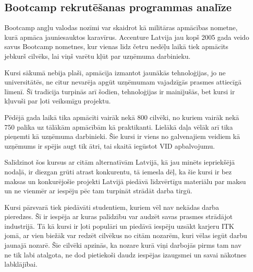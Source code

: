 \subsection{Bootcamp rekrutēšanas programmas analīze}
Bootcamp angļu valodas nozīmi var skaidrot kā militāras apmācības nometne, kurā apmāca jauniesauktos
karavīrus. Accenture Latvija jau kopš 2005 gada veido savus Bootcamp nometnes, kur vienas līdz četru 
nedēļu laikā tiek apmācīts jebkurš cilvēks, lai viņš varētu kļūt par uzņēmuma darbinieku.
\par
Kursi sākumā nebija plaši, apmācīja izmantot jaunākās tehnoloģijas, jo ne universitātēs, ne citur
nevarēja apgūt uzņēmumam vajadzīgās prasmes attiecīgā līmenī. Šī tradīcija turpinās arī šodien,
tehnoloģijas ir mainījušās, bet kursi ir kļuvuši par ļoti veiksmīgu projektu.
\par
Pēdējā gada laikā tika apmācīti vairāk nekā 800 cilvēki, no kuriem vairāk nekā 750 palika uz tālākām
apmācībām kā praktikanti. Lielākā daļa vēlāk arī tika pieņemti kā uzņēmuma darbinieki. Šie kursi ir
viens no galvenajiem veidiem kā uzņēmums ir spējis augt tik ātri, tai skaitā iegūstot VID apbalvojumu.
\par
Salīdzinot šos kursus ar citām alternatīvām Latvijā, kā jau minēts iepriekšējā nodaļā,
ir diezgan grūti atrast konkurentu, tā iemesla dēļ, ka šie kursi ir bez maksas un konkurējošie projekti
Latvijā piedāvā līdzvērtīgu materiālu par maksu un ne vienmēr ar iespēju pēc tam turpināt strādāt 
darba tirgū.
\par
Kursi pārsvarā tiek piedāvāti studentiem, kuriem vēl nav nekādas darba pieredzes. Šī ir iespēja
ar kuras palīdzību var audzēt savas prasmes strādājot industrijā. Tā kā kursi ir ļoti populāri un piedāvā
iespēju uzsākt karjeru ITK jomā, ar vien biežāk var redzēt cilvēkus no citām nozarēm, kuri vēlas iegūt
darbu jaunajā nozarē. Šie cilvēki apzinās, ka nozare kurā viņi darbojās pirms tam nav ne tik labi atalgota,
ne dod pietiekoši daudz iespējas izaugsmei un savai nākotnes labklājībai.
\par
